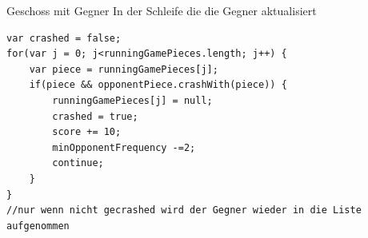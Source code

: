 \documentclass[18pt]{beamer}
\begin{document}
\begin{frame}[fragile]{Geschoss mit Gegner}
In der Schleife die die Gegner aktualisiert
\begin{lstlisting}
var crashed = false;
for(var j = 0; j<runningGamePieces.length; j++) {
	var piece = runningGamePieces[j];
	if(piece && opponentPiece.crashWith(piece)) {
		runningGamePieces[j] = null;
		crashed = true;
		score += 10;
		minOpponentFrequency -=2;
		continue;
	}
}
//nur wenn nicht gecrashed wird der Gegner wieder in die Liste aufgenommen
\end{lstlisting}
\end{frame}
\end{document}
